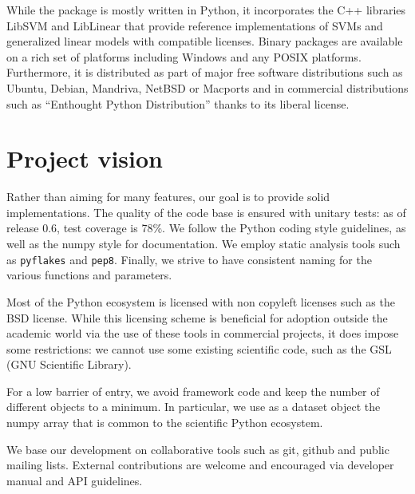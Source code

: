 \documentclass[twoside,11pt]{article}
\begin{document}
While the package is mostly written in Python, it incorporates the C++
libraries LibSVM \citep{chang2001} and LibLinear \citep{fan2008} that
provide reference implementations of SVMs and generalized linear models
with compatible licenses.
%
Binary packages are available on a rich set of platforms including
Windows and any POSIX platforms. Furthermore, it is distributed as part
of major free software distributions such as Ubuntu, Debian, Mandriva,
NetBSD or Macports and in commercial distributions such as ``Enthought
Python Distribution'' thanks to its liberal license.




\section {Project vision}

%
Rather than aiming for many features, our goal is to provide solid
implementations. The quality of the code base is ensured with unitary
tests: as of release 0.6, test coverage is 78\%. We follow the
Python
coding style guidelines, as well as the numpy style for documentation. We
employ static analysis tools such as {\tt pyflakes} and {\tt pep8}.
Finally, we strive to have consistent naming for the various functions
and parameters.

\smallskip {}
%
Most of the Python ecosystem is licensed with non copyleft licenses such
as the BSD license. While this licensing scheme is beneficial for adoption
outside the academic world via the use of these tools in commercial
projects, it does impose some restrictions: we cannot use some existing
scientific code, such as the GSL (GNU Scientific Library).

\smallskip {}
%
For a low barrier of entry, we avoid framework code and keep the number
of different objects to a minimum. In particular, we use as a dataset
object the numpy array \citep{Vanderwalt2011} that is common to the
scientific Python ecosystem.

\smallskip
{}
%
We base our development on collaborative tools such as git, github and
public mailing lists. External contributions are welcome and
encouraged via developer manual and API guidelines.
\end{document}
